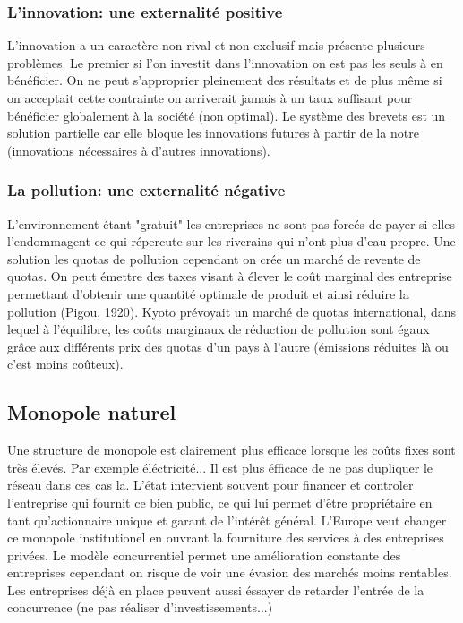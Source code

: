 \subsubsection{L'innovation: une externalité positive} %
\label{sub:l_innovation_une_externalite_positive}

L'innovation a un caractère non rival et non exclusif mais présente plusieurs problèmes. Le premier si l'on investit dans l'innovation on est pas les seuls à en bénéficier. On ne peut s'approprier pleinement des résultats et de plus même si on acceptait cette contrainte on arriverait jamais à un taux suffisant pour bénéficier globalement à la société (non optimal). Le système des brevets est un solution partielle car elle bloque les innovations futures à partir de la notre (innovations nécessaires à d'autres innovations). 

\subsubsection{La pollution: une externalité négative} %
\label{sub:la_pollution_une_externalite_negative}

L'environnement étant "gratuit" les entreprises ne sont pas forcés de payer si elles l'endommagent ce qui répercute sur les riverains qui n'ont plus d'eau propre. Une solution les quotas de pollution cependant on crée un marché de revente de quotas. On peut émettre des taxes visant à élever le coût marginal des entreprise permettant d'obtenir une quantité optimale de produit et ainsi réduire la pollution (Pigou, 1920). Kyoto prévoyait un marché de quotas international, dans lequel à l'équilibre, les coûts marginaux de réduction de pollution sont égaux grâce aux différents prix des quotas d'un pays à l'autre (émissions réduites là ou c'est moins coûteux).

\subsection{Monopole naturel} %
\label{sec:monopole_naturel}

Une structure de monopole est clairement plus efficace lorsque les coûts fixes sont très élevés. Par exemple éléctricité... Il est plus éfficace de ne pas dupliquer le réseau dans ces cas la. L'état intervient souvent pour financer et controler l'entreprise qui fournit ce bien public, ce qui lui permet d'être propriétaire en tant qu'actionnaire unique et garant de l'intérêt général. L'Europe veut changer ce monopole institutionel en ouvrant la fourniture des services à des entreprises privées. Le modèle concurrentiel permet une amélioration constante des entreprises cependant on risque de voir une évasion des marchés moins rentables. Les entreprises déjà en place peuvent aussi éssayer de retarder l'entrée de la concurrence (ne pas réaliser d'investissements...)

